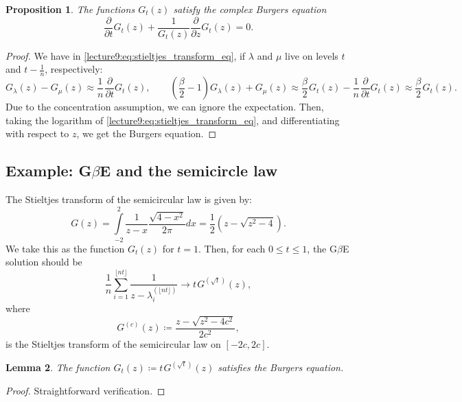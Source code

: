 \documentclass[letterpaper,11pt,oneside,reqno]{book}
\numberwithin{equation}{chapter}  %
\newcommand{\ssp}{\hspace{1pt}}
\newtheorem{proposition}{Proposition}[chapter]  %
\newtheorem{lemma}[proposition]{Lemma}
\theoremstyle{definition}
\begin{document}
\begin{proposition}
	The functions $G_t(z)$ satisfy the complex Burgers equation
	\begin{equation*}
		\frac{\partial}{\partial t}G_t(z) +
		\frac{1}{G_t(z)}\frac{\partial}{\partial z}G_t(z) = 0.
	\end{equation*}
\end{proposition}
\begin{proof}
	We have in \eqref{lecture9:eq:stieltjes_transform_eq},
	if $\lambda$ and $\mu$ live on levels $t$ and $t-\frac{1}{n}$,
	respectively:
	\begin{equation*}
		G_\lambda(z)-G_\mu(z)\approx
		\frac{1}{n}\ssp\frac{\partial}{\partial t}G_t(z),
		\qquad
		\left( \frac{\beta}{2}-1 \right)G_\lambda(z) + G_\mu(z) \approx
		\frac{\beta}{2}\ssp G_t(z) - \frac{1}{n}\ssp\frac{\partial}{\partial t}G_t(z)
		\approx
		\frac{\beta}{2}\ssp G_t(z) .
	\end{equation*}
	Due to the concentration assumption, we can ignore the expectation.
	Then, taking the logarithm of \eqref{lecture9:eq:stieltjes_transform_eq},
	and differentiating with respect to $z$,
	we get the Burgers equation.
\end{proof}

\subsection{Example: G$\beta$E and the semicircle law}

The Stieltjes transform of the semicircular law is given by:
\begin{equation*}
	G(z) = \int\limits_{-2}^{2}\frac{1}{z-x}\frac{\sqrt{4-x^2}}{2\pi}dx =
	\frac{1}{2} \left(z-\sqrt{z^2-4}\right).
\end{equation*}
We take this as the function $G_t(z)$ for $t=1$.
Then, for each $0\le t\le 1$, the
G$\beta$E solution should be
\begin{equation*}
	\frac{1}{n}\sum_{i=1}^{\lfloor nt \rfloor }\frac{1}{z-\lambda_i^{(\lfloor nt \rfloor )}}
	\to t\ssp G^{(\sqrt t)}(z),
\end{equation*}
where
\begin{equation*}
	G^{(c)}(z) \coloneqq \frac{z-\sqrt{z^2-4c^2}}{2c^2},
\end{equation*}
is the Stieltjes transform of the semicircular law on $[-2c, 2c]$.

\begin{lemma}
	\label{lecture9:lemma:semicircle_and_burgers}
	The function $G_t(z)\coloneqq t\ssp G^{(\sqrt t)}(z)$
	satisfies the Burgers equation.
\end{lemma}
\begin{proof}
	Straightforward verification.
\end{proof}
\end{document}
